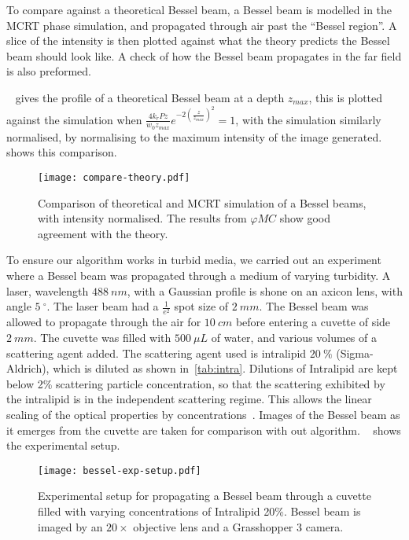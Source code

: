 To compare against a theoretical Bessel beam, a Bessel beam is modelled in the MCRT phase simulation, and propagated through air past the ``Bessel region''. 
A slice of the intensity is then plotted against what the theory predicts the Bessel beam should look like. 
A check of how the Bessel beam propagates in the far field is also preformed.


~ gives the profile of a theoretical Bessel beam at a depth $z_{max}$, this is plotted against the simulation when $\tfrac{4k_rPz}{w_0z_{max}}e^{-2\left(\tfrac{z}{z_{max}}\right)^2}=1$, with the simulation similarly normalised, by normalising to the maximum intensity of the image generated. ~ shows this comparison.


\begin{figure}[!ht]
    \centering
    \texttt{[image: compare-theory.pdf]}
    \caption{Comparison of theoretical and MCRT simulation of a Bessel beams, with intensity normalised. The results from $\varphi MC$ show good agreement with the theory.}
    \label{fig:besselCompare}
\end{figure}

To ensure our algorithm works in turbid media, we carried out an experiment where a Bessel beam was propagated through a medium of varying turbidity.
A laser, wavelength $488~nm$, with a Gaussian profile is shone on an axicon lens, with angle $5~^{\circ}$.
The laser beam had a $\tfrac{1}{e^2}$ spot size of $2~mm$. 
The Bessel beam was allowed to propagate through the air for $10~cm$ before entering a cuvette of side $2~mm$.
The cuvette was filled with $500~\mu L$ of water, and various volumes of a scattering agent added.
The scattering agent used is intralipid $20~\%$ (Sigma-Aldrich), which is diluted as shown in~\cref{tab:intra}.
Dilutions of Intralipid are kept below 2\% scattering particle concentration, so that the scattering exhibited by the intralipid is in the independent scattering regime.
This allows the linear scaling of the optical properties by concentrations~\cite{aernouts2013supercontinuum,vardaki2015studying,di2011effect}.
Images of the Bessel beam as it emerges from the cuvette are taken for comparison with out algorithm.
~ shows the experimental setup.

\begin{figure}[ht!]
    \centering
    \texttt{[image: bessel-exp-setup.pdf]}
    \caption{Experimental setup for propagating a Bessel beam through a cuvette filled with varying concentrations of Intralipid 20\%. Bessel beam is imaged by an $20\times$ objective lens and a Grasshopper 3 camera.}
    \label{fig:expsetup}
\end{figure}

